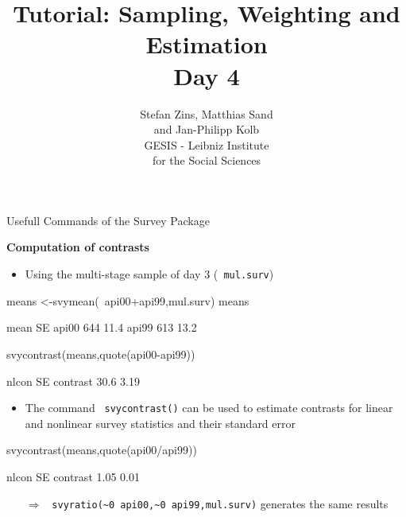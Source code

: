 \documentclass[11pt,german,hideothersubsections]{beamer}
\title[Day 1]{Tutorial: Sampling, Weighting and Estimation\\ \Large{Day 4} }
\author[M. Sand]{Stefan Zins, Matthias Sand\\ and Jan-Philipp Kolb\\ \vspace{.5cm} \footnotesize{GESIS - Leibniz Institute\\ for the Social Sciences}}
\date[]{\color{dunkelgrau}\footnotesize%
\begin{minipage}{8cm}%
\begin{center}%
\scriptsize{
\textbf{GESIS Summer School}\\ \tiny{Cologne, Germany}%
}\\
\vspace{0.25cm}
\textbf{August 27th, 2015}%

\end{center}%
\end{minipage}}%
\newcommand{\R}[1]{{\tt \color{blue}  #1}}
\begin{document}

\maketitle
\begin{frame}[fragile]{Usefull Commands} {of the Survey Package}
\footnotesize{
\vspace{-.25cm}
\begin{center}
\textbf{Computation of contrasts}
\end{center}
\begin{itemize}
\item Using the multi-stage sample of day 3 (\R{mul.surv})
\end{itemize}
\begin{Schunk}
\begin{Sinput}
 means <-svymean(~api00+api99,mul.surv)
 means
\end{Sinput}
\begin{Soutput}
      mean   SE
api00  644 11.4
api99  613 13.2
\end{Soutput}
\begin{Sinput}
 svycontrast(means,quote(api00-api99))
\end{Sinput}
\begin{Soutput}
         nlcon   SE
contrast  30.6 3.19
\end{Soutput}
\end{Schunk}
\begin{itemize}
\item The command \R{svycontrast()} can be used to estimate contrasts for linear and nonlinear survey statistics and their standard error
\end{itemize}
\begin{Schunk}
\begin{Sinput}
 svycontrast(means,quote(api00/api99))
\end{Sinput}
\begin{Soutput}
         nlcon   SE
contrast  1.05 0.01
\end{Soutput}
\end{Schunk}
\begin{itemize}
\item[$\Rightarrow$] \R{svyratio(\textasciitilde0 api00,\textasciitilde0 api99,mul.surv)} generates the same results
\end{itemize}
}
\end{frame}
\end{document}
